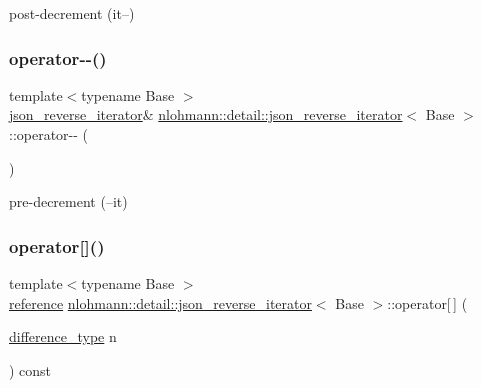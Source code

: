 post-\/decrement (it--) 

\mbox{\label{classnlohmann_1_1detail_1_1json__reverse__iterator_a2488d6a902103610943920ac49d12a04}} 
\subsubsection{\texorpdfstring{operator-\/-\/()}{operator--()}\hspace{0.1cm}{\footnotesize\ttfamily [2/2]}}
{\footnotesize\ttfamily template$<$typename Base $>$ \\
\hyperlink{classnlohmann_1_1detail_1_1json__reverse__iterator}{json\+\_\+reverse\+\_\+iterator}\& \hyperlink{classnlohmann_1_1detail_1_1json__reverse__iterator}{nlohmann\+::detail\+::json\+\_\+reverse\+\_\+iterator}$<$ Base $>$\+::operator-\/-\/ (\begin{DoxyParamCaption}{ }\end{DoxyParamCaption})\hspace{0.3cm}{\ttfamily [inline]}}



pre-\/decrement (--it) 

\mbox{\label{classnlohmann_1_1detail_1_1json__reverse__iterator_a8ed9e445e03c49c46612eb7f7d55bb61}} 
\subsubsection{\texorpdfstring{operator[]()}{operator[]()}}
{\footnotesize\ttfamily template$<$typename Base $>$ \\
\hyperlink{classnlohmann_1_1detail_1_1json__reverse__iterator_a42f51a69bac7b2aebb613b2164e457f1}{reference} \hyperlink{classnlohmann_1_1detail_1_1json__reverse__iterator}{nlohmann\+::detail\+::json\+\_\+reverse\+\_\+iterator}$<$ Base $>$\+::operator\mbox{[}$\,$\mbox{]} (\begin{DoxyParamCaption}\item[{\hyperlink{classnlohmann_1_1detail_1_1json__reverse__iterator_a9ab55987c05ec6427ad36082e351cc45}{difference\+\_\+type}}]{n }\end{DoxyParamCaption}) const\hspace{0.3cm}{\ttfamily [inline]}}




